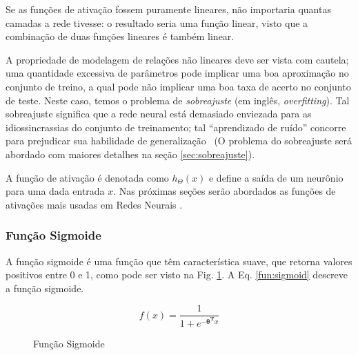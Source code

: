Se as funções de ativação fossem puramente lineares, não importaria quantas camadas a rede tivesse: o resultado seria uma função linear, visto que a combinação de duas funções lineares é também linear. 

A propriedade de modelagem de relações não lineares deve ser vista com cautela; uma quantidade excessiva de parâmetros pode implicar uma boa aproximação no conjunto de treino, a qual pode não implicar uma boa taxa de acerto no conjunto de teste. Neste caso, temos o problema de \textit{sobreajuste} (em inglês, \textit{overfitting}). Tal sobreajuste significa que a rede neural está demasiado enviezada para as idiossincrassias do conjunto de treinamento; tal ``aprendizado de ruído'' concorre para prejudicar sua habilidade de generalização~\cite{activationfun, haykin2004comprehensive, haykin2009neural, lecun2015deep} (O problema do sobreajuste será abordado com maiores detalhes na seção \ref{sec:sobreajuste}).


A função de ativação é denotada como $h_\Theta (x)$ e define a saída de um neurônio para uma dada entrada $x$. Nas próximas seções serão abordados as funções de ativações mais usadas em Redes Neurais \cite{activationfun, haykin2004comprehensive, haykin2009neural, lecun2015deep}.

\subsubsection{Função Sigmoide}
\label{subsec:sigmoid}

A função sigmoide é uma função que têm característica suave, que retorna valores positivos entre 0 e 1, como pode ser visto na  Fig. \ref{fg:funcao_sigmoide}. A Eq. \eqref{fun:sigmoid} descreve a função sigmoide.


\begin{equation}
  f(x) =  \frac{\mathrm{1} }{\mathrm{1} + e^{- \mathbf{\theta^T}x}}
  \label{fun:sigmoid}
\end{equation}

\begin{center}
    \begin{figure}
     \caption{Função Sigmoide}
        \centering
   \label{fg:funcao_sigmoide}
	\end{figure}
\end{center}

